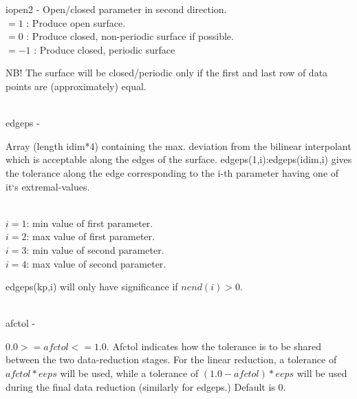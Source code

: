        \>\>   {\fov iopen2}\> - \> Open/closed parameter in second direction.\\
          \>\>\>\>  $= 1$  : Produce open surface.\\
          \>\>\>\>  $= 0$ : Produce closed, non-periodic surface if possible.\\
          \>\>\>\>  $= -1$ : Produce closed, periodic surface\\
        \>\>\>\>  \begin{minipg2}
                  NB! The surface will be closed/periodic only if the first 
                      and last row of data points are (approximately) equal.
                               \end{minipg2}\\[0.8ex]
        \>\>    {\fov edgeps}\> - \>  \begin{minipg2}
                     Array (length idim*4) containing the max. deviation from
                  the bilinear interpolant which is acceptable along the
                  edges of the surface.
                  edgeps(1,i):edgeps(idim,i) gives the tolerance along
                  the edge corresponding to the i-th parameter having
                  one of it`s extremal-values.
                     \end{minipg2}\\[0.8ex]
          \>\>\>\> $i=1$: min value of first parameter.\\ 
          \>\>\>\> $i=2$: max value of first parameter.\\
          \>\>\>\> $i=3$: min value of second parameter.\\
          \>\>\>\> $i=4$: max value of second parameter.\\
          \>\>\>\>  \begin{minipg2}
                  edgeps(kp,i) will only have significance if $nend(i)>0$.
                               \end{minipg2}\\[0.8ex]
        \>\>    {\fov afctol}\> - \>  \begin{minipg2}
                     $0.0 >= afctol <= 1.0$.
                  Afctol indicates how the tolerance is to be shared
                  between the two data-reduction stages. For the linear
                  reduction, a tolerance of $afctol*eeps$ will be used,
                  while a tolerance of $(1.0-afctol)*eeps$ will be used
                  during the final data reduction (similarly for edgeps.)
                  Default is 0.
                               \end{minipg2}\\[0.8ex]
